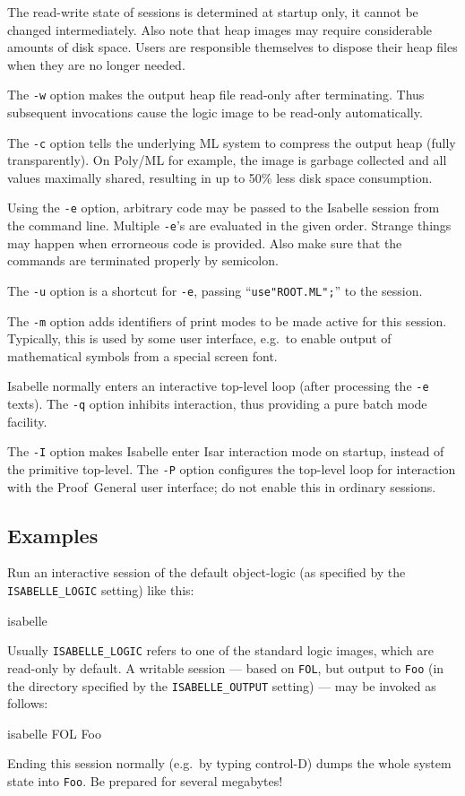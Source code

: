 The read-write state of sessions is determined at startup only, it cannot be
changed intermediately. Also note that heap images may require considerable
amounts of disk space. Users are responsible themselves to dispose their heap
files when they are no longer needed.

\medskip The \texttt{-w} option makes the output heap file read-only after
terminating.  Thus subsequent invocations cause the logic image to be
read-only automatically.

\medskip The \texttt{-c} option tells the underlying ML system to compress the
output heap (fully transparently).  On Poly/ML for example, the image is
garbage collected and all values maximally shared, resulting in up to 50\%
less disk space consumption.

\medskip Using the \texttt{-e} option, arbitrary {\ML} code may be passed to
the Isabelle session from the command line. Multiple \texttt{-e}'s are
evaluated in the given order. Strange things may happen when errorneous {\ML}
code is provided. Also make sure that the {\ML} commands are terminated
properly by semicolon.

\medskip The \texttt{-u} option is a shortcut for \texttt{-e}, passing
``\texttt{use"ROOT.ML";}'' to the {\ML} session.

\medskip The \texttt{-m} option adds identifiers of print modes to be made
active for this session. Typically, this is used by some user interface, e.g.\ 
to enable output of mathematical symbols from a special screen font.

\medskip Isabelle normally enters an interactive top-level loop (after
processing the \texttt{-e} texts). The \texttt{-q} option inhibits
interaction, thus providing a pure batch mode facility.

\medskip The \texttt{-I} option makes Isabelle enter Isar interaction mode on
startup, instead of the primitive {\ML} top-level.  The \texttt{-P} option
configures the top-level loop for interaction with the Proof~General user
interface; do not enable this in ordinary sessions.


\subsection*{Examples}

Run an interactive session of the default object-logic (as specified
by the \texttt{ISABELLE_LOGIC} setting) like this:
\begin{ttbox}
isabelle
\end{ttbox}
Usually \texttt{ISABELLE_LOGIC} refers to one of the standard logic
images, which are read-only by default.  A writable session --- based
on \texttt{FOL}, but output to \texttt{Foo} (in the directory
specified by the \texttt{ISABELLE_OUTPUT} setting) --- may be invoked
as follows:
\begin{ttbox}
isabelle FOL Foo
\end{ttbox}
Ending this session normally (e.g.\ by typing control-D) dumps the
whole {\ML} system state into \texttt{Foo}. Be prepared for several
megabytes!

